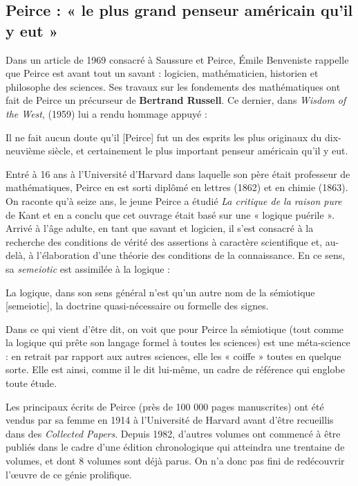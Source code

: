 \subsection{Peirce : « le plus grand penseur américain qu’il y eut »}
Dans un article de 1969 consacré à Saussure et Peirce, Émile Benveniste rappelle que Peirce est avant tout un savant : logicien, mathématicien, historien et philosophe des sciences. Ses travaux sur les fondements des mathématiques ont fait de Peirce un précurseur de \textbf{Bertrand Russell}. Ce dernier, dans \textit{Wisdom of the West}, (1959) lui a rendu hommage appuyé :
\begin{lecture}{}
Il ne fait aucun doute qu’il [Peirce] fut un des esprits les plus originaux du dix-neuvième siècle, et certainement le plus important penseur américain qu’il y eut.
\end{lecture}
Entré à 16 ans à l’Université d’Harvard dans laquelle son père était professeur de mathématiques, Peirce en est sorti diplômé en lettres (1862) et en chimie (1863). On raconte qu’à seize ans, le jeune Peirce a étudié \textit{La critique de la raison pure} de Kant et en a conclu que cet ouvrage était basé sur une « logique puérile ». Arrivé à l’âge adulte, en tant que savant et logicien, il s’est consacré à la recherche des conditions de vérité des assertions à caractère scientifique et, au-delà, à l’élaboration d’une théorie des conditions de la connaissance. En ce sens, sa \textit{semeiotic} est assimilée à la logique :
\begin{lecture}{}
La logique, dans son sens général n’est qu’un autre nom de la sémiotique [semeiotic], la doctrine quasi-nécessaire ou formelle des signes.
\end{lecture}
Dans ce qui vient d’être dit, on voit que pour Peirce la sémiotique (tout comme la logique qui prête son langage formel à toutes les sciences) est une méta-science : en retrait par rapport aux autres sciences, elle les « coiffe » toutes en quelque sorte. Elle est ainsi, comme il le dit lui-même, un cadre de référence qui englobe toute étude.

Les principaux écrits de Peirce (près de 100 000 pages manuscrites) ont été vendus par sa femme en 1914 à l’Université de Harvard avant d’être recueillis dans des \textit{Collected Papers}. Depuis 1982, d’autres volumes ont commencé à être publiés dans le cadre d’une édition chronologique qui atteindra une trentaine de volumes, et dont 8 volumes sont déjà parus. On n’a donc pas fini de redécouvrir l’œuvre de ce génie prolifique.

